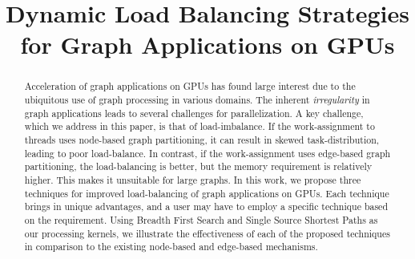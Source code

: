 \documentclass[conference,10pt]{IEEEtran}
\newcommand{\REM}[1]{}
\begin{document}
\title{Dynamic Load Balancing Strategies for Graph Applications on GPUs}
\author{}
\author{
}
\maketitle

\begin{abstract}
Acceleration of graph applications on GPUs has found large interest due to the ubiquitous use of graph processing in various domains. The inherent \textit{irregularity} in graph applications leads to several challenges for parallelization. A key challenge, which we address in this paper, is that of load-imbalance. If the work-assignment to threads uses node-based graph partitioning, it can result in skewed task-distribution, leading to poor load-balance. In contrast, if the work-assignment uses edge-based graph partitioning, the load-balancing is better, but the memory requirement is relatively higher. This makes it unsuitable for large graphs. In this work, we propose three techniques for improved load-balancing of graph applications on GPUs. Each technique brings in unique advantages, and a user may have to employ a specific technique based on the requirement. Using Breadth First Search and Single Source Shortest Paths as our processing kernels, we illustrate the effectiveness of each of the proposed techniques in comparison to the existing node-based and edge-based mechanisms.
\end{abstract}



\end{document}
